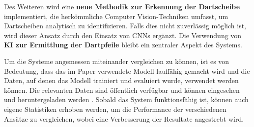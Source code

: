 Des Weiteren wird eine \textbf{neue Methodik zur Erkennung der Dartscheibe} implementiert, die herkömmliche Computer Vision-Techniken umfasst, um Dartscheiben analytisch zu identifizieren. Falls dies nicht zuverlässig möglich ist, wird dieser Ansatz durch den Einsatz von CNNs ergänzt. Die Verwendung von \textbf{KI zur Ermittlung der Dartpfeile} bleibt ein zentraler Aspekt des Systems.

Um die Systeme angemessen miteinander vergleichen zu können, ist es von Bedeutung, dass das im Paper verwendete Modell lauffähig gemacht wird und die Daten, auf denen das Modell trainiert und evaluiert wurde, verwendet werden können. Die relevanten Daten sind öffentlich verfügbar und können eingesehen und heruntergeladen werden \cite{deepdarts-data}. Sobald das System funktionsfähig ist, können auch eigene Statistiken erhoben werden, um die Performance der verschiedenen Ansätze zu vergleichen, wobei eine Verbesserung der Resultate angestrebt wird.

\iffalse

